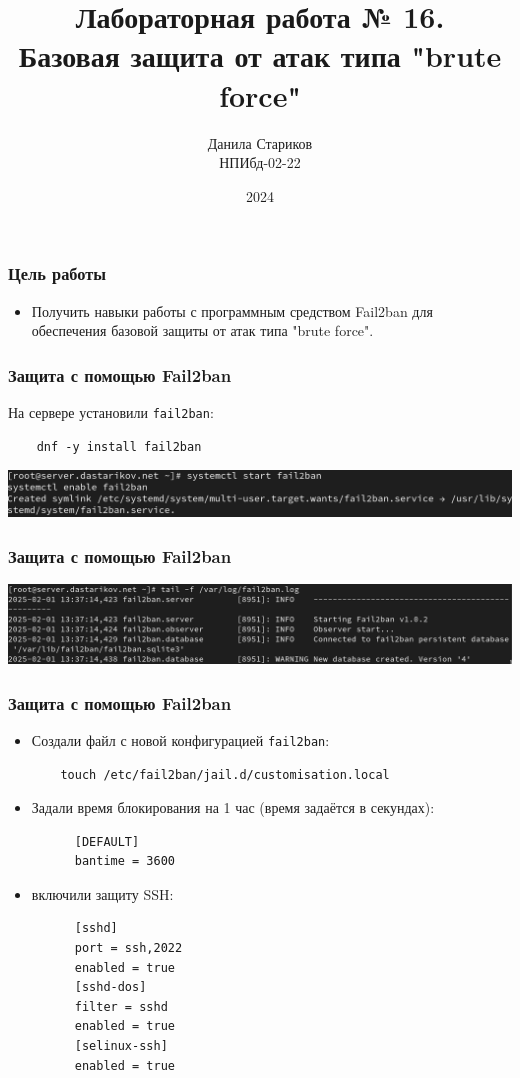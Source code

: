 

\title{Лабораторная работа № 16. \\ Базовая защита от атак типа "brute force"}
\author{Данила Стариков \\ НПИбд-02-22}
\date{2024}



\frame{\titlepage}

\begin{frame}
\frametitle{Цель работы}
\begin{itemize}
    \item Получить навыки работы с программным средством Fail2ban для обеспечения базовой защиты от атак типа "brute force".
\end{itemize}
\end{frame}

\begin{frame}[fragile]
\frametitle{Защита с помощью Fail2ban}
На сервере установили {\tt fail2ban}:
\begin{verbatim}
    dnf -y install fail2ban
\end{verbatim}
    \centering
    \includegraphics[width=\textwidth]{../images/image01.png}
\end{frame}

\begin{frame}
\frametitle{Защита с помощью Fail2ban}
    \centering
    \includegraphics[width=\textwidth]{../images/image02.png}
\end{frame}

\begin{frame}[fragile]
\frametitle{Защита с помощью Fail2ban}
\begin{itemize}
\item Создали файл с новой конфигурацией {\tt fail2ban}:
\begin{verbatim}
    touch /etc/fail2ban/jail.d/customisation.local
\end{verbatim}
\item Задали время блокирования на 1 час (время задаётся в секундах):
\begin{verbatim}
      [DEFAULT]
      bantime = 3600
\end{verbatim}
  \item включили защиту SSH:
\begin{verbatim}
      [sshd]
      port = ssh,2022
      enabled = true
      [sshd-dos]
      filter = sshd
      enabled = true
      [selinux-ssh]
      enabled = true
\end{verbatim}
\end{itemize}
\end{frame}

